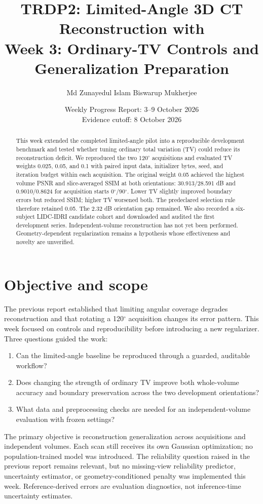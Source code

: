 \documentclass[10pt,a4paper]{article}
\title{\vspace{-1.3cm}\large\bfseries TRDP2: Limited-Angle 3D CT Reconstruction with \Rtwo\\[4pt]
\normalsize Week 3: Ordinary-TV Controls and Generalization Preparation}
\author{\normalsize Md Zunayedul Islam \qquad Biswarup Mukherjee}
\date{\small Weekly Progress Report: 3--9 October 2026\\Evidence cutoff: 8 October 2026}
\begin{document}
\maketitle
\vspace{-1em}
\begin{abstract}
This week extended the completed limited-angle pilot into a reproducible development benchmark and tested whether tuning ordinary total variation (TV) could reduce its reconstruction deficit. We reproduced the two 120$^\circ$ acquisitions and evaluated TV weights 0.025, 0.05, and 0.1 with paired input data, initializer bytes, seed, and iteration budget within each acquisition. The original weight 0.05 achieved the highest volume PSNR and slice-averaged SSIM at both orientations: 30.913/28.591 dB and 0.9010/0.8624 for acquisition starts 0$^\circ$/90$^\circ$. Lower TV slightly improved boundary errors but reduced SSIM; higher TV worsened both. The predeclared selection rule therefore retained 0.05. The 2.32 dB orientation gap remained. We also recorded a six-subject LIDC-IDRI candidate cohort and downloaded and audited the first development series. Independent-volume reconstruction has not yet been performed. Geometry-dependent regularization remains a hypothesis whose effectiveness and novelty are unverified.
\end{abstract}

\section{Objective and scope}
The previous report established that limiting angular coverage degrades reconstruction and that rotating a 120$^\circ$ acquisition changes its error pattern. This week focused on controls and reproducibility before introducing a new regularizer. Three questions guided the work:
\begin{enumerate}
\item Can the limited-angle baseline be reproduced through a guarded, auditable workflow?
\item Does changing the strength of ordinary TV improve both whole-volume accuracy and boundary preservation across the two development orientations?
\item What data and preprocessing checks are needed for an independent-volume evaluation with frozen settings?
\end{enumerate}
The primary objective is reconstruction generalization across acquisitions and independent volumes. Each scan still receives its own Gaussian optimization; no population-trained model was introduced. The reliability question raised in the previous report remains relevant, but no missing-view reliability predictor, uncertainty estimator, or geometry-conditioned penalty was implemented this week. Reference-derived errors are evaluation diagnostics, not inference-time uncertainty estimates.
\end{document}
